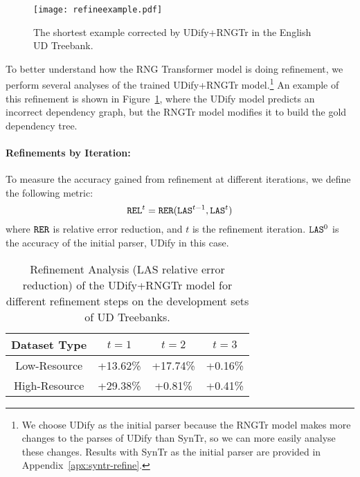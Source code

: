 \begin{figure}
\centering
  \texttt{[image: refineexample.pdf]}
  \caption{The shortest example corrected by UDify+RNGTr in the English UD Treebank.}
  \label{fig:refineexample}
\end{figure}

To better understand how the RNG Transformer model is doing refinement, we perform several analyses of the trained UDify+RNGTr model.\footnote{We choose UDify as the initial parser because the RNGTr model makes more changes to the parses of UDify than SynTr, so we can more easily analyse these changes. Results with SynTr as the initial parser are provided in Appendix~\ref{apx:syntr-refine}.}
An example of this refinement is shown in Figure~\ref{fig:refineexample}, where the UDify model predicts an incorrect dependency graph, but the RNGTr model modifies it to build the gold dependency tree.

\paragraph{Refinements by Iteration:}
To measure the accuracy gained from refinement at different iterations, we define the following metric:
\begin{equation}
{\tt REL}^t = {\tt RER}({\tt LAS}^{t-1},{\tt LAS}^t)
\label{eq:refine}
\end{equation}
where ${\tt RER}$ is relative error reduction, and $t$ is the refinement iteration. ${\tt LAS}^0$ is the accuracy of the initial parser, UDify in this case.

\begin{table}
\centering
  \begin{adjustbox}{width=\linewidth}
  
  \begin{tabular}{|c|c|c|c|}
    \hline
    Dataset Type & $t=1$ & $t=2$ & $t=3$ \\
    \hline
     Low-Resource & +13.62\% & +17.74\%  & +0.16\% \\
     High-Resource & +29.38\% & +0.81\% & +0.41\% \\
     




\hline
    
    \end{tabular}
  \end{adjustbox}
\caption{Refinement Analysis (LAS relative error reduction) of the UDify+RNGTr model for different refinement steps on the development sets of UD Treebanks.}
\label{table:refine}
\end{table}

